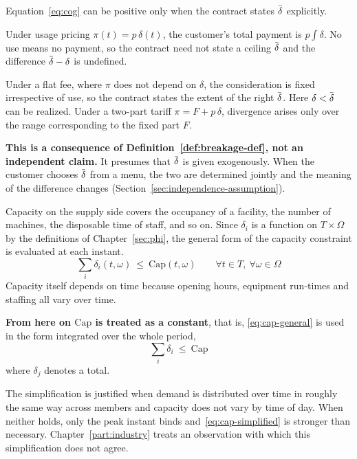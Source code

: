 \begin{remark}
\label{prop:breakage}
Equation~\eqref{eq:cog} can be positive only when the contract states $\dbar$ explicitly.

Under usage pricing $\pi(t)=p\,\delta(t)$, the customer's total payment is $p\int\delta$.
No use means no payment, so the contract need not state a ceiling $\dbar$ and the difference
$\dbar-\delta$ is undefined.

Under a flat fee, where $\pi$ does not depend on $\delta$, the consideration is fixed
irrespective of use, so the contract states the extent of the right $\dbar$. Here
$\delta<\dbar$ can be realized. Under a two-part tariff $\pi=F+p\,\delta$, divergence
arises only over the range corresponding to the fixed part $F$.

\textbf{This is a consequence of Definition~\ref{def:breakage-def}, not an independent
claim.} It presumes that $\dbar$ is given exogenously. When the customer chooses $\dbar$
from a menu, the two are determined jointly and the meaning of the difference changes
(Section~\ref{sec:independence-assumption}).
\end{remark}

\begin{remark}
\label{rem:cap-simplification}
Capacity on the supply side covers the occupancy of a facility, the number of machines, the
disposable time of staff, and so on. Since $\delta_i$ is a function on $T\times\Omega$ by
the definitions of Chapter~\ref{sec:phi}, the general form of the capacity constraint is
evaluated at each instant.
\begin{equation}
\sum_i \delta_i(t,\omega) \ \leq\ \mathrm{Cap}(t,\omega)
\qquad \forall t\in T,\ \forall\omega\in\Omega
\label{eq:cap-general}
\end{equation}
Capacity itself depends on time because opening hours, equipment run-times and staffing all
vary over time.

\textbf{From here on $\mathrm{Cap}$ is treated as a constant}, that is,
\eqref{eq:cap-general} is used in the form integrated over the whole period,
\begin{equation}
\sum_i \delta_i \ \leq\ \mathrm{Cap}
\label{eq:cap-simplified}
\end{equation}
where $\delta_j$ denotes a total.

The simplification is justified when demand is distributed over time in roughly the same way
across members and capacity does not vary by time of day. When neither holds, only the peak
instant binds and~\eqref{eq:cap-simplified} is stronger than necessary.
Chapter~\ref{part:industry} treats an observation with which this simplification does not
agree.
\end{remark}

